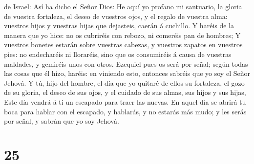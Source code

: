 de Israel: Así ha dicho el Señor Dios: He aquí yo profano mi santuario,
la gloria de vuestra fortaleza, el deseo de vuestros ojos, y el regalo
de vuestra alma: vuestros hijos y vuestras hijas que dejasteis, caerán á
cuchillo.  Y haréis de la manera que yo hice: no os
cubriréis con rebozo, ni comeréis pan de hombres;  Y
vuestros bonetes estarán sobre vuestras cabezas, y vuestros zapatos en
vuestros pies: no endecharéis ni lloraréis, sino que os consumiréis á
causa de vuestras maldades, y gemiréis unos con otros. 
Ezequiel pues os será por señal; según todas las cosas que él hizo,
haréis: en viniendo esto, entonces sabréis que yo soy el Señor Jehová.
 Y tú, hijo del hombre, el día que yo quitaré de ellos su
fortaleza, el gozo de su gloria, el deseo de sus ojos, y el cuidado de
sus almas, sus hijos y sus hijas,  Este día vendrá á ti un
escapado para traer las nuevas.  En aquel día se abrirá tu
boca para hablar con el escapado, y hablarás, y no estarás más mudo; y
les serás por señal, y sabrán que yo soy Jehová.

\hypertarget{section-24}{%
\section{25}\label{section-24}}

